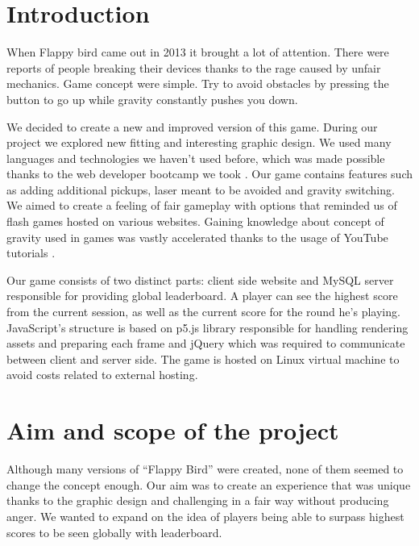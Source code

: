 \documentclass[oneside,a4paper,11pt]{report}
\begin{document}







\chapter{Introduction}
When Flappy bird came out in 2013 it brought a lot of attention. There were reports of people breaking their devices thanks to the rage caused by unfair mechanics. Game concept were simple. Try to avoid obstacles by pressing the button to go up while gravity constantly pushes you down.

\par
We decided to create a new and improved version of this game. During our project we explored new fitting and interesting graphic design. We used many languages and technologies we haven't used before, which was made possible thanks to the web developer bootcamp we took \cite{Bootcamp}. Our game contains features such as adding additional pickups, laser meant to be avoided and gravity switching. We aimed to create a feeling of fair gameplay with options that reminded us of flash games hosted on various websites. Gaining knowledge about concept of gravity used in games was vastly accelerated thanks to the usage of YouTube tutorials \cite{CodingTrain} \cite{Phpcourse} \cite{ProgrammingwithMosh}.


\par
Our game consists of two distinct parts: client side website and MySQL server responsible for providing global leaderboard. A player can see the highest score from the current session, as well as the current score for the round he’s playing. JavaScript's structure is based on p5.js library responsible for handling rendering assets and preparing each frame and jQuery which was required to communicate between client and server side. The game is hosted on Linux virtual machine to avoid costs related to external hosting.


\chapter{Aim and scope of the project}

Although many versions of “Flappy Bird” were created, none of them seemed to change the concept enough. Our aim was to create an experience that was unique thanks to the graphic design and challenging in a fair way without producing anger. We wanted to expand on the idea of players being able to surpass highest scores to be seen globally with leaderboard.
\end{document}
